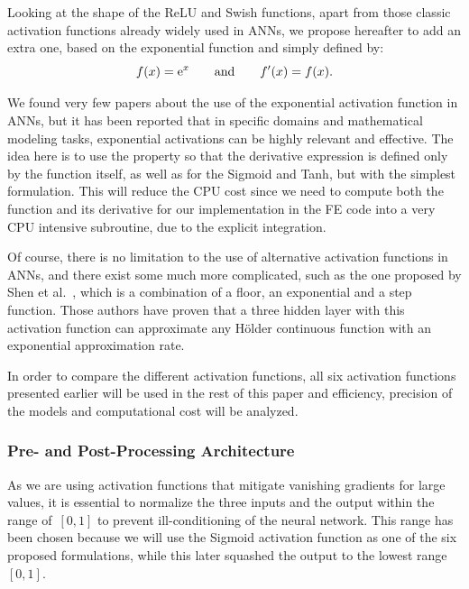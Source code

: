 \documentclass[algorithms,article,accept,pdftex,oneauthor]{Definitions/mdpi}
\DeclareRobustCommand{\e}[1]{{\rm e}^{#1}}
\begin{document}
Looking at the shape of the ReLU and Swish functions, apart from those classic activation functions already widely used in ANNs, we propose hereafter to add an extra one, based on the exponential function and simply defined by:
\begin{equation}
f(x) = \e{x}\qquad \text{and}\qquad f'(x) = f(x).\label{eq:act-exp}
\end{equation}

We found very few papers about the use of the exponential activation function in ANNs, but it has been reported that in specific domains and mathematical modeling tasks, exponential activations can be highly relevant and effective.
The idea here is to use the property so that the derivative expression is defined only by the function itself, as well as for the Sigmoid and Tanh, but with the simplest formulation.
This will reduce the CPU cost since we need to compute both the function and its derivative for our implementation in the FE code into a very CPU intensive subroutine, due to the explicit integration.

Of course, there is no limitation to the use of alternative activation functions in ANNs, and there exist some much more complicated, such as the one proposed by Shen et al.~\cite{Shen-2021-NNA}, which is a combination of a floor, an exponential and a step function.
Those authors have proven that a three hidden layer with this activation function can approximate any Hölder continuous function with an exponential approximation rate.

In order to compare the different activation functions, all six activation functions presented earlier will be used in the rest of this paper and efficiency, precision of the models and computational cost will be analyzed.

\subsubsection{Pre- and Post-Processing Architecture}\label{subsubsec:ANN-pre}

As we are using activation functions that mitigate vanishing gradients for large values, it is essential to normalize the three inputs and the output within the range of~$[0,1]$ to prevent ill-conditioning of the neural network.
This range has been chosen because we will use the Sigmoid activation function as one of the six proposed formulations, while this later squashed the output to the lowest range~$[0,1]$.
\end{document}

